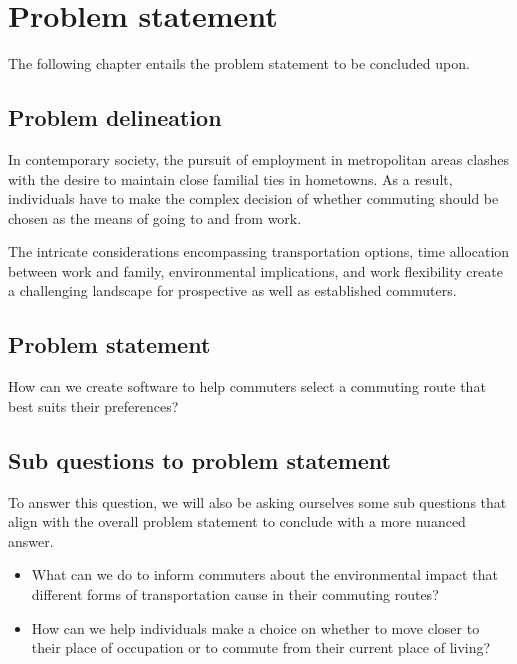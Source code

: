 \chapter{Problem statement}\label{ch:problem-statement}

The following chapter entails the problem statement to be concluded upon.

\section{Problem delineation}\label{sec:problem-delineation}

In contemporary society, the pursuit of employment in metropolitan areas clashes with the desire to maintain close
familial ties in hometowns.
As a result, individuals have to make the complex decision of whether commuting should be chosen as the means of
going to and from work.

The intricate considerations encompassing transportation options, time allocation between work and family, environmental
implications, and work flexibility create a challenging landscape for prospective as well as established commuters.

\section{Problem statement}\label{sec:problem-statement}

How can we create software to help commuters select a commuting route that best suits their preferences?

\section{Sub questions to problem statement}\label{sec:sub-questions-to-problem-statement}

To answer this question, we will also be asking ourselves some sub questions that align with the overall problem
statement to conclude with a more nuanced answer.

\begin{itemize}
    \item What can we do to inform commuters about the environmental impact that different forms of transportation
    cause in their commuting routes?
    \item How can we help individuals make a choice on whether to move closer to their place of occupation or to commute
    from their current place of living?
\end{itemize}
